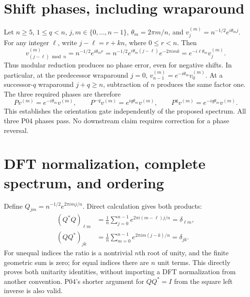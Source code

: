 \documentclass[11pt]{article}
\begin{document}
\section{Shift phases, including wraparound}
Let $n\ge5$, $1\le q<n$, $j,m\in\{0,\ldots,n-1\}$,
$\theta_m=2\pi m/n$, and
$v_j^{(m)}=n^{-1/2}e^{i\theta_m j}$. For any integer $\ell$, write
$j-\ell=r+kn$, where $0\le r<n$. Then
\[
 v^{(m)}_{(j-\ell)\bmod n}=n^{-1/2}e^{i\theta_m r}
 =n^{-1/2}e^{i\theta_m(j-\ell)}e^{-2\pi i mk}
 =e^{-i\ell\theta_m}v_j^{(m)}.
\]
Thus modular reduction produces no phase error, even for negative shifts.
In particular, at the predecessor wraparound $j=0$,
$v_{n-1}^{(m)}=e^{-i\theta_m}v_0^{(m)}$. At a successor-$q$
wraparound $j+q\ge n$, subtraction of $n$ produces the same factor one.
The three required phases are therefore
\[
 Pv^{(m)}=e^{-i\theta_m}v^{(m)},\qquad
 P^{-q}v^{(m)}=e^{iq\theta_m}v^{(m)},\qquad
 P^qv^{(m)}=e^{-iq\theta_m}v^{(m)}.
\]
This establishes the orientation gate independently of the proposed spectrum.
All three P04 phases pass. No downstream claim requires correction for
a phase reversal.

\section{DFT normalization, complete spectrum, and ordering}
Define $Q_{jm}=n^{-1/2}e^{2\pi imj/n}$. Direct calculation gives both products:
\begin{align*}
 (Q^*Q)_{\ell m}&=\frac1n\sum_{j=0}^{n-1}e^{2\pi i(m-\ell)j/n}
                      =\delta_{\ell m},\\
 (QQ^*)_{jk}&=\frac1n\sum_{m=0}^{n-1}e^{2\pi im(j-k)/n}
                      =\delta_{jk}.
\end{align*}
For unequal indices the ratio is a nontrivial $n$th root of unity, and the
finite geometric sum is zero; for equal indices there are $n$ unit terms.
This directly proves both unitarity identities, without importing a DFT
normalization from another convention. P04's shorter argument for $QQ^*=I$
from the square left inverse is also valid.
\end{document}
